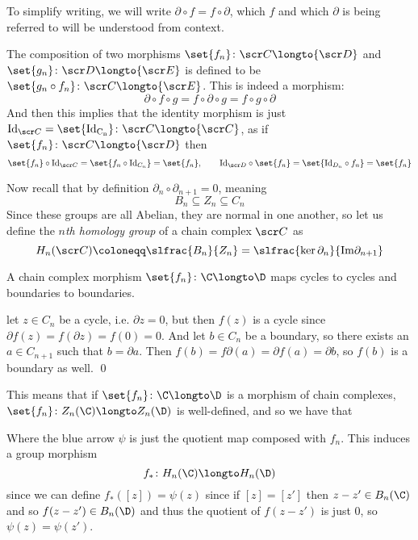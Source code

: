 To simplify writing, we will write $\partial\circ f=f\circ\partial$, which $f$ and which $\partial$ is being referred to will be understood from context.

The composition of two morphisms $\set{f_n}\colon{\scr C}\longto{\scr D}$ and $\set{g_n}\colon{\scr D}\longto{\scr E}$ is defined to be $\set{g_n\circ f_n}\colon{\scr C}\longto{\scr E}$.
This is indeed a morphism:
$$ \partial\circ f\circ g = f\circ\partial\circ g = f\circ g\circ\partial $$
And then this implies that the identity morphism is just ${\rm Id}_{\scr C}=\set{\rm Id_{C_n}}\colon{\scr C}\longto{\scr C}$, as if $\set{f_n}\colon{\scr C}\longto{\scr D}$ then
$$ \set{f_n}\circ{\rm Id}_{\scr C} = \set{f_n\circ {\rm Id}_{C_n}} = \set{f_n},\qquad {\rm Id}_{\scr D}\circ\set{f_n} = \set{{\rm Id}_{D_n}\circ f_n} = \set{f_n} $$

Now recall that by definition $\partial_n\circ\partial_{n+1}=0$, meaning
$$ B_n \subseteq Z_n \subseteq C_n $$
Since these groups are all Abelian, they are normal in one another, so let us define the {\it $n$th homology group} of a chain complex $\scr C$ as
$$ H_n({\scr C})\coloneqq\slfrac{\displaystyle B_n}{\displaystyle Z_n} = \slfrac{\displaystyle\ker\partial_n}{\displaystyle{\rm Im}\partial_{n+1}} $$

\bprop

    A chain complex morphism $\set{f_n}\colon\C\longto\D$ maps cycles to cycles and boundaries to boundaries.

\eprop

\Proof let $z\in C_n$ be a cycle, i.e. $\partial z=0$, but then $f(z)$ is a cycle since $\partial f(z)=f(\partial z)=f(0)=0$.
And let $b\in C_n$ be a boundary, so there exists an $a\in C_{n+1}$ such that $b=\partial a$.
Then $f(b)=f\partial(a)=\partial f(a)=\partial b$, so $f(b)$ is a boundary as well.
\qed

This means that if $\set{f_n}\colon\C\longto\D$ is a morphism of chain complexes, $\set{f_n}\colon Z_n(\C)\longto Z_n(\D)$ is well-defined, and so we have that

\centerline{\def\diagrowbuf{.5cm}\def\diagcolbuf{.5cm}
}

Where the blue arrow $\psi$ is just the quotient map composed with $f_n$.
This induces a group morphism
$$ f_*\colon H_n(\C)\longto H_n(\D) $$
since we can define $f_*([z])=\psi(z)$ since if $[z]=[z']$ then $z-z'\in B_n(\C)$ and so $f(z-z')\in B_n(\D)$ and thus the quotient of $f(z-z')$ is just $0$, so $\psi(z)=\psi(z')$.

